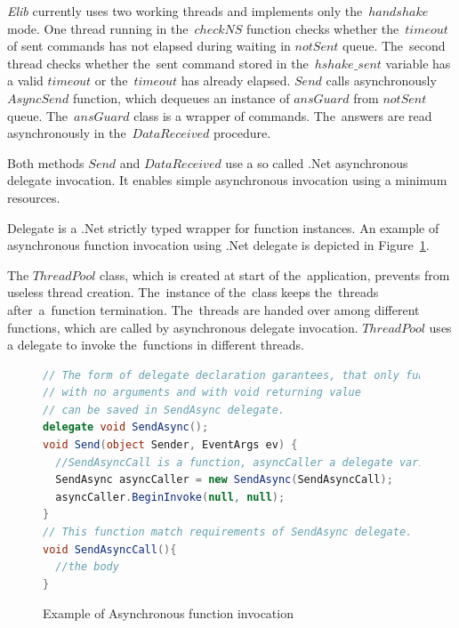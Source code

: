   {\it Elib} currently uses two working threads and implements only the~$handshake$ mode.
  One thread running in the~$checkNS$ function checks whether the~$timeout$ of sent commands
  has not elapsed during waiting in $notSent$ queue. The~second thread checks whether the~sent command
  stored in the~$hshake\_sent$ variable has a valid $timeout$ or the~$timeout$ has already elapsed.
  $Send$ calls asynchronously $AsyncSend$ function, which dequeues an instance of $ansGuard$ from $notSent$ queue.
  The~$ansGuard$ class is a wrapper of commands.
  The~answers are read asynchronously in the~$DataReceived$ procedure.
  \begin{remark}
  Both methods $Send$ and $DataReceived$ use a so called .Net asynchronous
  delegate invocation. It enables simple asynchronous invocation using a minimum resources.
  \end{remark}
  \begin{definition}[Delegate]
  Delegate\cite{delegate} is a .Net strictly typed wrapper for function instances.
  An example of asynchronous function invocation using .Net delegate is depicted in Figure~\ref{invocation}.
  \end{definition}
  \begin{remark}
  The $ThreadPool$ class, which is created at 
  start of the~application, prevents from useless thread creation. 
  The~instance of the~class keeps the~threads after~a~function termination.
  The~threads are handed over among different functions, which are called 
  by asynchronous delegate invocation.
  $ThreadPool$ uses a delegate to invoke the~functions in different threads.
  \end{remark}
  
\begin{figure}[!hbp]
\begin{lstlisting}[language=cs]
// The form of delegate declaration garantees, that only functions
// with no arguments and with void returning value 
// can be saved in SendAsync delegate.
delegate void SendAsync();
void Send(object Sender, EventArgs ev) {
  //SendAsyncCall is a function, asyncCaller a delegate variable
  SendAsync asyncCaller = new SendAsync(SendAsyncCall);
  asyncCaller.BeginInvoke(null, null);      
}
// This function match requirements of SendAsync delegate.
void SendAsyncCall(){
  //the body
}
\end{lstlisting}
\caption{Example of Asynchronous function invocation}\label{invocation}
\end{figure}

